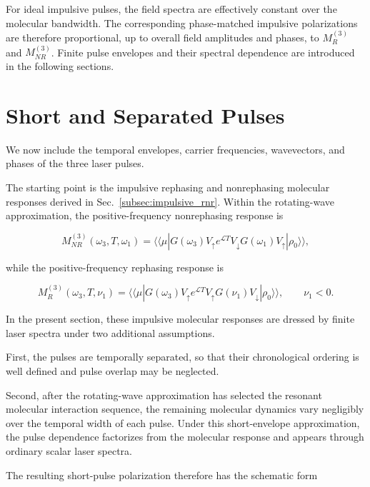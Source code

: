 \documentclass[11pt]{article}
\begin{document}
For ideal impulsive pulses, the field spectra are effectively constant
over the molecular bandwidth. The corresponding phase-matched
impulsive polarizations are therefore proportional, up to overall
field amplitudes and phases, to $M_R^{(3)}$ and $M_{NR}^{(3)}$.
Finite pulse envelopes and their spectral dependence are introduced in
the following sections.
\section{Short and Separated Pulses}
\label{sec:short_pulses}

We now include the temporal envelopes, carrier frequencies, wavevectors,
and phases of the three laser pulses.

The starting point is the impulsive rephasing and nonrephasing
molecular responses derived in
Sec.~\ref{subsec:impulsive_rnr}. Within the rotating-wave
approximation, the positive-frequency nonrephasing response is

\begin{equation}
M_{NR}^{(3)}
(\omega_3,T,\omega_1)
=
\langle\!\langle\mu|
G(\omega_3)
V_{\uparrow}
e^{\mathcal{L}T}
V_{\downarrow}
G(\omega_1)
V_{\uparrow}
|\rho_0\rangle\rangle,
\end{equation}

while the positive-frequency rephasing response is

\begin{equation}
M_{R}^{(3)}
(\omega_3,T,\nu_1)
=
\langle\!\langle\mu|
G(\omega_3)
V_{\uparrow}
e^{\mathcal{L}T}
V_{\uparrow}
G(\nu_1)
V_{\downarrow}
|\rho_0\rangle\rangle,
\qquad
\nu_1<0.
\end{equation}

In the present section, these impulsive molecular responses are dressed
by finite laser spectra under two additional assumptions.

First, the pulses are temporally separated, so that their chronological
ordering is well defined and pulse overlap may be neglected.

Second, after the rotating-wave approximation has selected the resonant
molecular interaction sequence, the remaining molecular dynamics vary
negligibly over the temporal width of each pulse. Under this
short-envelope approximation, the pulse dependence factorizes from the
molecular response and appears through ordinary scalar laser spectra.

The resulting short-pulse polarization therefore has the schematic
form
\end{document}
